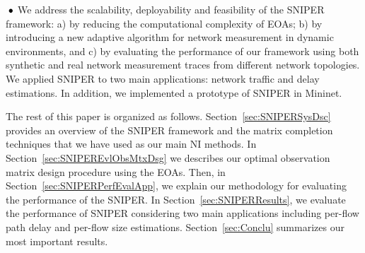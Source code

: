 \textbf{$\text{\hspace{0.1cm}}\bullet$} We address the scalability,
deployability and feasibility of the SNIPER framework: a) by reducing
the computational complexity of EOAs; b) by introducing a new adaptive
algorithm for network measurement in dynamic environments, and c) by
evaluating the performance of our framework using both synthetic and
real network measurement traces from different network topologies. We
applied SNIPER to two main applications: network traffic and delay
estimations. In addition, we implemented a prototype of SNIPER in
Mininet.

The rest of this paper is organized as
follows. Section~\ref{sec:SNIPERSysDsc} provides an overview of the
SNIPER framework and the matrix completion techniques that we have
used as our main NI methods.  In Section~\ref{sec:SNIPEREvlObsMtxDsg}
we describes our optimal observation matrix design procedure using the
EOAs. Then, in Section~\ref{sec:SNIPERPerfEvalApp}, we explain our
methodology for evaluating the performance of the SNIPER. In
Section~\ref{sec:SNIPERResults}, we evaluate the performance of SNIPER
considering two main applications including per-flow path delay and
per-flow size estimations. Section~\ref{sec:Conclu} summarizes our
most important results.
